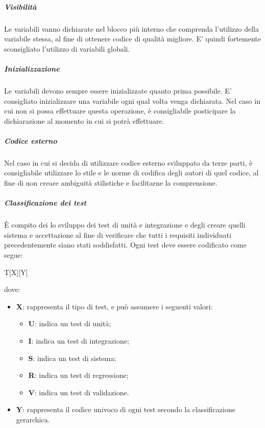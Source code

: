 	\subparagraph{Visibilità}
	Le variabili vanno dichiarate nel blocco più interno che comprenda l'utilizzo della variabile stessa, al fine di ottenere codice di qualità migliore. E' quindi fortemente sconsigliato l'utilizzo di variabili globali.
	
	\subparagraph{Inizializzazione}
	Le variabili devono sempre essere inizializzate quanto prima possibile. E' consigliato inizializzare una variabile ogni qual volta venga dichiarata. Nel caso in cui non si possa effettuare questa operazione, è consigliabile posticipare la dichiarazione al momento in cui si potrà effettuare.
	
	\subparagraph{Codice esterno}
	Nel caso in cui si decida di utilizzare codice esterno sviluppato da terze parti, è consigliabile utilizzare lo stile e le norme di codifica degli autori di quel codice, al fine di non creare ambiguità stilistiche e facilitarne la comprensione.
	
	\subparagraph{Classificazione dei test} 
	È compito dei \progs{} lo sviluppo dei test di unità e integrazione e degli \anas{} creare quelli sistema e accettazione al fine di verificare che tutti i requisiti individuati precedentemente siano stati soddisfatti. Ogni test deve essere codificato come segue:
	\begin{center}
		T[X][Y]
	\end{center}
	
	dove:\newline
	\begin{itemize}
		\item \textbf{X}: rappresenta il tipo di test, e può assumere i seguenti valori:
		\begin{itemize}
			\item \textbf{U}: indica un test di unità;
			\item \textbf{I}: indica un test di integrazione;
			\item \textbf{S}: indica un test di sistema;
			\item \textbf{R}: indica un test di regressione;
			\item \textbf{V}: indica un test di validazione.
		\end{itemize}
		\item \textbf{Y}: rappresenta il codice univoco di ogni test secondo la classificazione gerarchica.
	\end{itemize}
	
	
	
